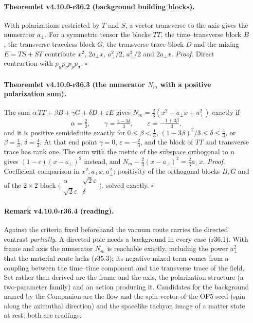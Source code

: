 \paragraph{Theoremlet v4.10.0-r36.2 (background building blocks).}
With polarizations restricted by \(T\) and \(S\), a vector transverse to the axis gives the numerator \(a_\perp\).  For a symmetric tensor the blocks
\(TT\), the time--transverse block \(B\), the transverse traceless block \(G\), the transverse trace block \(D\) and the mixing \(E=TS+ST\) contribute
\(x^2\), \(2a_\perp x\), \(a_\perp^2/2\), \(a_\perp^2/2\) and \(2a_\perp x\).  \emph{Proof.} Direct contraction with \(p_\mu p_\nu p_\rho p_\sigma\).  \(\square\)

\paragraph{Theoremlet v4.10.0-r36.3 (the numerator \(N_m\) with a positive polarization sum).}
The sum \(\alpha\,TT+\beta B+\gamma G+\delta D+\varepsilon E\) gives \(N_m=\tfrac23(x^2-a_\perp x+a_\perp^2)\) exactly if
\[
 \alpha=\tfrac23,\qquad \gamma=\tfrac{4-3\delta}{3},\qquad \varepsilon=-\tfrac{1+3\beta}{3},
\]
and it is positive semidefinite exactly for \(0\le\beta<\tfrac13\), \((1+3\beta)^2/3\le\delta\le\tfrac43\), or \(\beta=\tfrac13\), \(\delta=\tfrac43\).  At that end point
\(\gamma=0\), \(\varepsilon=-\tfrac23\), and the block of \(TT\) and transverse trace has rank one.  The sum with the metric of the subspace orthogonal to \(n\)
gives \((1-c)(x-a_\perp)^2\) instead, and \(N_m-\tfrac23(x-a_\perp)^2=\tfrac23a_\perp x\).
\emph{Proof.} Coefficient comparison in \(x^2,a_\perp x,a_\perp^2\); positivity of the orthogonal blocks \(B,G\) and of the \(2\times2\) block
\(\bigl(\begin{smallmatrix}\alpha&\sqrt2\varepsilon\\\sqrt2\varepsilon&\delta\end{smallmatrix}\bigr)\), solved exactly.  \(\square\)

\paragraph{Remark v4.10.0-r36.4 (reading).}
Against the criteria fixed beforehand the vacuum route carries the directed contrast \emph{partially}.  A directed pole needs a background in
every case (r36.1).  With frame and axis the numerator \(N_m\) is reachable exactly, including the power \(a_\perp^2\) that the material route lacks
(r35.3); its negative mixed term comes from a coupling between the time--time component and the transverse trace of the field.  Set rather
than derived are the frame and the axis, the polarization structure (a two-parameter family) and an action producing it.  Candidates for the
background named by the Companion are the flow and the spin vector of the OP5 seed (spin along the azimuthal direction) and the spacelike
tachyon image of a matter state at rest; both are readings.

